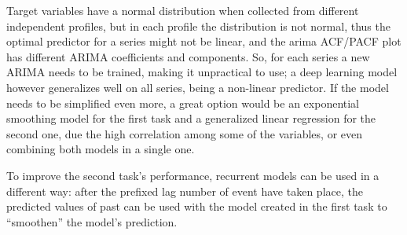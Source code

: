 Target variables have a normal distribution when collected from different independent profiles, but in each profile the distribution is not normal, thus the optimal predictor for a series might not be linear, and the arima ACF/PACF plot has different ARIMA coefficients and components.
So, for each series a new ARIMA needs to be trained, making it unpractical to use; a deep learning model however generalizes well on all series, being a non-linear predictor.
If the model needs to be simplified even more, a great option would be an exponential smoothing model for the first task and a generalized linear regression for the second one, due the high correlation among some of the variables, or even combining both models in a single one.

To improve the second task's performance, recurrent models can be used in a different way: after the prefixed lag number of event have taken place, the predicted values of past can be used with the model created in the first task to ``smoothen'' the model's prediction.








